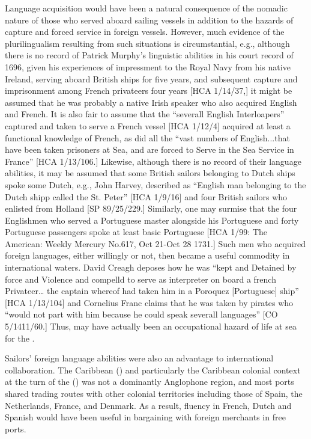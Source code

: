 Language acquisition would have been a natural consequence of the nomadic nature of those who served aboard sailing vessels in addition to the hazards of capture and forced service in foreign vessels. However, much evidence of the plurilingualism resulting from such situations is circumstantial, e.g., although there is no record of Patrick Murphy’s linguistic abilities in his court record of 1696, given his experiences of impressment to the Royal Navy from his native Ireland, serving aboard British ships for five years, and subsequent capture and imprisonment among French privateers four years [HCA 1/14/37,] it might be assumed that he was probably a native Irish speaker who also acquired English and French. It is also fair to assume that the “severall English Interloapers” captured and taken to serve a French vessel [HCA 1/12/4] acquired at least a functional knowledge of French, as did all the “vast numbers of English...that have been taken prisoners at Sea, and are forced to Serve in the Sea Service in France” [HCA 1/13/106.]  Likewise, although there is no record of their language abilities, it may be assumed that some British sailors belonging to Dutch ships spoke some Dutch, e.g., John Harvey, described as “English man belonging to the Dutch shipp called the St. Peter” [HCA 1/9/16] and four British sailors who enlisted from Holland [SP 89/25/229.] Similarly, one may surmise that the four Englishmen who served a Portuguese master alongside his Portuguese  and forty Portuguese passengers spoke at least basic Portuguese [HCA 1/99: The American: Weekly Mercury No.617, Oct 21-Oct 28 1731.] Such men who acquired foreign languages, either willingly or not, then became a useful commodity in international waters. David Creagh deposes how he was “kept and Detained by force and Violence and compelld to serve as interpreter on board a french Privateer… the captain whereof had taken him in a Poroquez [Portuguese] ship” [HCA 1/13/104] and Cornelius Franc claims that he was taken by pirates who “would not part with him because he could speak severall languages” [CO 5/1411/60.] Thus,  may have actually been an occupational hazard of life at sea for the . 

Sailors’ foreign language abilities were also an advantage to international collaboration. The Caribbean () and particularly the Caribbean colonial context at the turn of the  () was not a dominantly Anglophone region, and most ports shared trading routes with other colonial territories including those of Spain, the Netherlands, France, and Denmark. As a result, fluency in French, Dutch and Spanish would have been useful in bargaining with foreign merchants in free ports.

